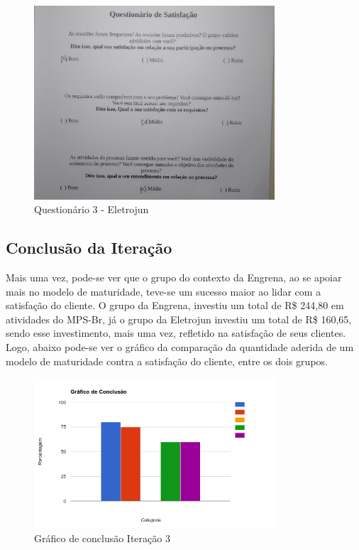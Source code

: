 \begin{figure}[H]
  \center
  \includegraphics[width=0.8\textwidth]{figuras/quest6}
  \caption{Questionário 3 - Eletrojun}
  \label{fig:quest6}
\end{figure}


\subsection{Conclusão da Iteração}

Mais uma vez, pode-se ver que o grupo do contexto da Engrena, ao se apoiar mais no modelo de maturidade, teve-se um sucesso maior ao lidar com a satisfação do cliente.
O grupo da Engrena, investiu um total de R\$ 244,80 em atividades do MPS-Br, já o grupo da Eletrojun investiu um total de R\$ 160,65, sendo esse investimento, mais uma vez, refletido na satisfação de seus clientes.
Logo, abaixo pode-se ver o gráfico da comparação da quantidade aderida de um modelo de maturidade contra a satisfação do cliente, entre os dois grupos.

\begin{figure}[H]
  \center
  \includegraphics[width=0.8\textwidth]{figuras/plot3}
  \caption{Gráfico de conclusão Iteração 3}
  \label{fig:plot3}
\end{figure}


